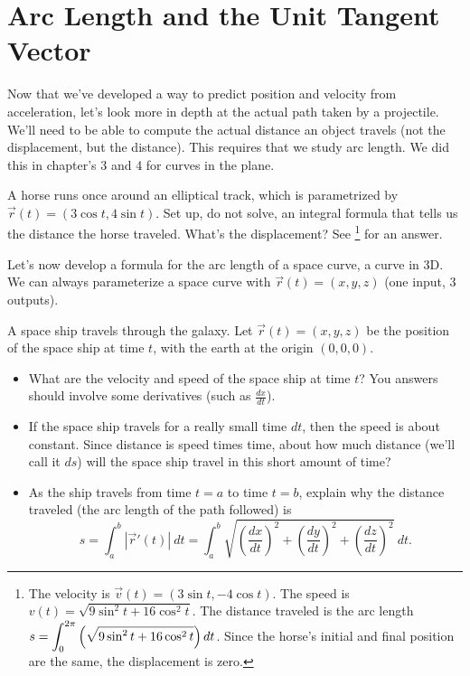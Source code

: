 \section{Arc Length and the Unit Tangent Vector}
Now that we've developed a way to predict position and velocity from acceleration, let's look more in depth at the actual path taken by a projectile. We'll need to be able to compute the actual distance an object travels (not the displacement, but the distance).  This requires that we study arc length.  We did this in chapter's 3 and 4 for curves in the plane.

\begin{review*}
 A horse runs once around an elliptical track, which is parametrized by $\vec r(t) = (3\cos t,4\sin t)$.  Set up, do not solve, an integral formula that tells us the distance the horse traveled. What's the displacement? See 
\footnote{The velocity is $\vec v(t) = (3\sin t, -4\cos t)$. The speed is $v(t) = \sqrt{9\sin^2t+16\cos^2t}$. The distance traveled is the arc length $\displaystyle s=\int_0^{2\pi} \left(\sqrt{9\sin^2t+16\cos^2t}\right)dt$. Since the horse's initial and final position are the same, the displacement is zero. }
for an answer.
\end{review*}
 

Let's now develop a formula for the arc length of a space curve, a curve in 3D. We can always parameterize a space curve with $\vec r(t) = (x,y,z)$ (one input, 3 outputs).

\begin{problem}
A space ship travels through the galaxy. Let $\vec r(t) = (x,y,z)$ 
%
be the position of the space ship at time $t$, with the earth at the origin $(0,0,0)$. 
\begin{itemize}
 \item What are the velocity and speed of the space ship at time $t$? You answers should involve some derivatives (such as $\frac{dx}{dt}$).
 \item If the space ship travels for a really small time $dt$, then the speed is about constant. Since distance is speed times time, about how much distance (we'll call it $ds$) will the space ship travel in this short amount of time?
 \item As the ship travels from time $t=a$ to time $t=b$, explain why the distance traveled (the arc length of the path followed) is $$s=\int_a^b |\vec r '(t)|\ dt = \int_a^b \sqrt{\left(\frac{dx}{dt}\right)^2+\left(\frac{dy}{dt}\right)^2+\left(\frac{dz}{dt}\right)^2}\ dt .$$
\end{itemize}

\end{problem}

